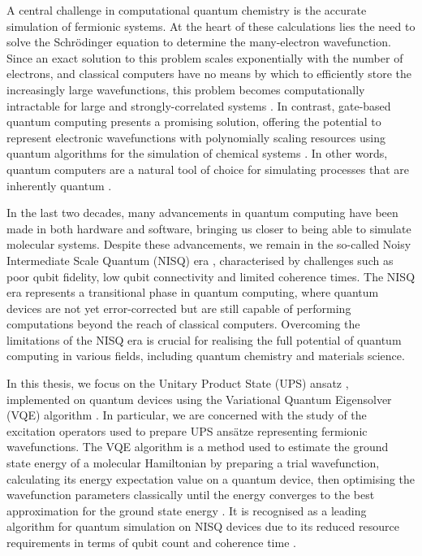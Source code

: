 A central challenge in computational quantum chemistry is the accurate simulation of fermionic systems. At the heart of these calculations lies the need to solve the Schrödinger equation to determine the many-electron wavefunction. Since an exact solution to this problem scales exponentially with the number of electrons, and classical computers have no means by which to efficiently store the increasingly large wavefunctions, this problem becomes computationally intractable for large and strongly-correlated systems \cite{Szalay2011}. In contrast, gate-based quantum computing presents a promising solution, offering the potential to represent electronic wavefunctions with polynomially scaling resources using quantum algorithms for the simulation of chemical systems \cite{Kassal2011}. In other words, quantum computers are a natural tool of choice for simulating processes that are inherently quantum \cite{Yeung2020}.

In the last two decades, many advancements in quantum computing have been made in both hardware and software, bringing us closer to being able to simulate molecular systems. Despite these advancements, we remain in the so-called Noisy Intermediate Scale Quantum (NISQ) era \cite{Preskill2018}, characterised by challenges such as poor qubit fidelity, low qubit connectivity and limited coherence times. The NISQ era represents a transitional phase in quantum computing, where quantum devices are not yet error-corrected but are still capable of performing computations beyond the reach of classical computers. Overcoming the limitations of the NISQ era is crucial for realising the full potential of quantum computing in various fields, including quantum chemistry and materials science.


In this thesis, we focus on the Unitary Product State (UPS) ansatz \cite{Burton2023}, implemented on quantum devices using the Variational Quantum Eigensolver (VQE) algorithm \cite{Wecker2015}. In particular, we are concerned with the study of the excitation operators used to prepare UPS ansätze representing fermionic wavefunctions. The VQE algorithm is a method used to estimate the ground state energy of a molecular Hamiltonian by preparing a trial wavefunction, calculating its energy expectation value on a quantum device, then optimising the wavefunction parameters classically until the energy converges to the best approximation for the ground state energy \cite{McClean2016}. It is recognised as a leading algorithm for quantum simulation on NISQ devices due to its reduced resource requirements in terms of qubit count and coherence time \cite{Kirby2020}.

